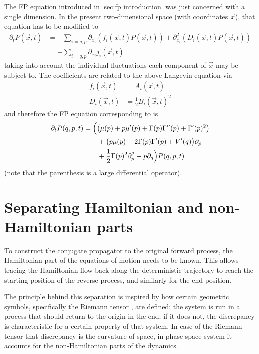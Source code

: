 The FP equation introduced in \ref{sec:fp introduction} was just concerned with a single dimension. In the present two-dimensional space (with coordinates \(\vec x\)), that equation has to be modified to
%
\begin{align}
	\partial_tP(\vec x,t)
	&= - \sum_{i=q,p} \partial_{x_i} (f_i(\vec x,t)P(\vec x,t)) + \partial_{x_i}^2 (D_i(\vec x,t)P(\vec x,t)) \\
	&= - \sum_{i=q,p} \partial_{x_i}j_i(\vec x,t)
\end{align}
%
taking into account the individual fluctuations each component of \(\vec x\) may be subject to. The coefficients are related to the above Langevin equation via
%
\begin{align}
	f_i(\vec x,t) &= A_i(\vec x,t) \\
	D_i(\vec x,t) &= \frac12B_i(\vec x,t)^2
\end{align}
%
and therefore the FP equation corresponding to  is
%
\begin{equation}\begin{split}
	\partial_t P(q,p,t)
	&= \Bigl( \bigl(\mu(p)+p\mu'(p) + \Gamma(p)\Gamma''(p) + \Gamma'(p)^2 \bigr) \\
	&\qquad +\bigl(p\mu(p) + 2\Gamma(p)\Gamma'(p) + V'(q)\bigr)\partial_p \\
	&\qquad +\frac12\Gamma(p)^2\partial_p^2 - p\partial_q\Bigr) P(q,p,t)
\end{split}\end{equation}
%
(note that the parenthesis is a large differential operator).
















\section{Separating Hamiltonian and non-Hamiltonian parts}

To construct the conjugate propagator to the original forward process, the Hamiltonian part of the equations of motion needs to be known. This allows tracing the Hamiltonian flow back along the deterministic trajectory to reach the starting position of the reverse process, and similarly for the end position.

The principle behind this separation is inspired by how certain geometric symbols, specifically the Riemann tensor , are defined: the system is run in a process that should return to the origin in the end; if it does not, the discrepancy is characteristic for a certain property of that system. In case of the Riemann tensor that discrepancy is the curvature of space, in phase space system it accounts for the non-Hamiltonian parts of the dynamics.

